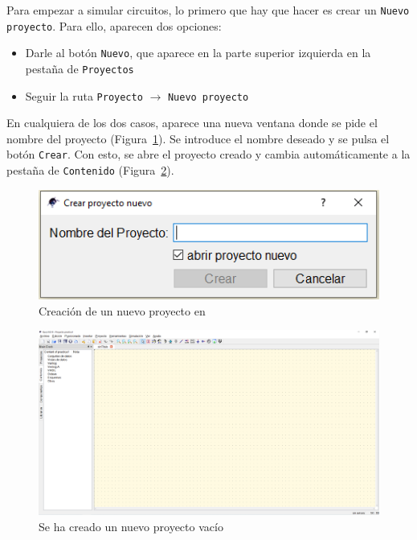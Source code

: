 \documentclass[a4paper,10pt]{article} %
\begin{document}
Para empezar a simular circuitos, lo primero que hay que hacer es crear un \texttt{Nuevo proyecto}. Para ello, aparecen dos opciones:
\begin{itemize}
    \item Darle al botón \texttt{Nuevo}, que aparece en la parte superior izquierda en la pestaña de \texttt{Proyectos}
    \item Seguir la ruta \texttt{Proyecto} $\rightarrow$ \texttt{Nuevo proyecto}
\end{itemize}
En cualquiera de los dos casos, aparece una nueva ventana donde se pide el nombre del proyecto (Figura~\ref{fig.qucs2}). Se introduce el nombre deseado y se pulsa el botón \texttt{Crear}. Con esto, se abre el proyecto creado y {\qucs} cambia automáticamente a la pestaña de \texttt{Contenido} (Figura~\ref{fig.qucs3}).
\begin{figure}[htbp]
    \centering
    \includegraphics[width=0.35\linewidth]{../figs/qucs2.PNG}
    \caption{Creación de un nuevo proyecto en \qucs}
    \label{fig.qucs2}
\end{figure}
\begin{figure}[htbp]
    \centering
    \includegraphics[width=\linewidth]{../figs/qucs3.PNG}
    \caption{Se ha creado un nuevo proyecto vacío}
    \label{fig.qucs3}
\end{figure}
\end{document}
